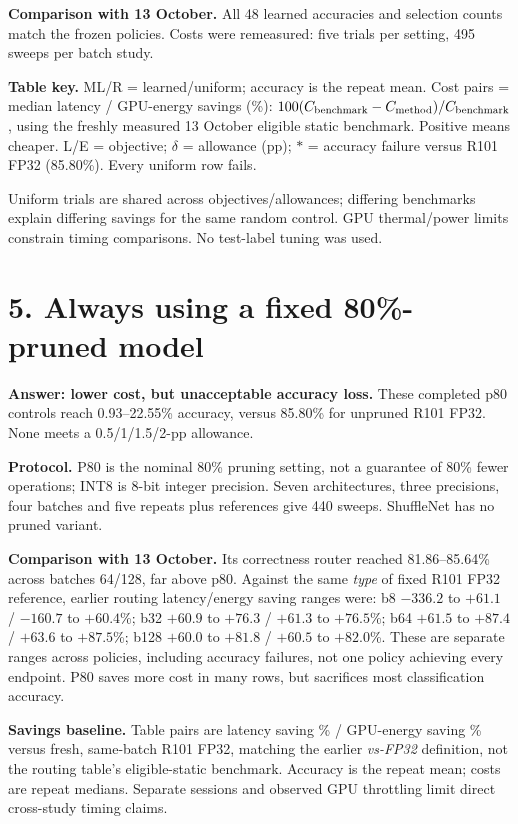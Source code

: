 \documentclass[10pt,a4paper]{article}
\renewcommand{\arraystretch}{1.13}
\begin{document}
\textbf{Comparison with 13 October.} All 48 learned accuracies and selection counts match the frozen policies. Costs were remeasured: five trials per setting, 495 sweeps per batch study.

\textbf{Table key.} ML/R = learned/uniform; accuracy is the repeat mean. Cost pairs = median latency / GPU-energy savings (\%): $100(C_{\rm benchmark}-C_{\rm method})/C_{\rm benchmark}$, using the freshly measured 13 October eligible static benchmark. Positive means cheaper. L/E = objective; $\delta$ = allowance (pp); $*$ = accuracy failure versus R101 FP32 (85.80\%). Every uniform row fails.

\begin{center}\footnotesize\setlength{\tabcolsep}{2.0pt}\renewcommand{\arraystretch}{1.25}\end{center}

Uniform trials are shared across objectives/allowances; differing benchmarks explain differing savings for the same random control. GPU thermal/power limits constrain timing comparisons. No test-label tuning was used.

\section*{5. Always using a fixed 80\%-pruned model}
\textbf{Answer: lower cost, but unacceptable accuracy loss.} These completed p80 controls reach 0.93--22.55\% accuracy, versus 85.80\% for unpruned R101 FP32. None meets a 0.5/1/1.5/2-pp allowance.

\textbf{Protocol.} P80 is the nominal 80\% pruning setting, not a guarantee of 80\% fewer operations; INT8 is 8-bit integer precision. Seven architectures, three precisions, four batches and five repeats plus references give 440 sweeps. ShuffleNet has no pruned variant.

\textbf{Comparison with 13 October.} Its correctness router reached 81.86--85.64\% across batches 64/128, far above p80. Against the same \emph{type} of fixed R101 FP32 reference, earlier routing latency/energy saving ranges were: b8 $-336.2$ to $+61.1$ / $-160.7$ to $+60.4$\%; b32 $+60.9$ to $+76.3$ / $+61.3$ to $+76.5$\%; b64 $+61.5$ to $+87.4$ / $+63.6$ to $+87.5$\%; b128 $+60.0$ to $+81.8$ / $+60.5$ to $+82.0$\%. These are separate ranges across policies, including accuracy failures, not one policy achieving every endpoint. P80 saves more cost in many rows, but sacrifices most classification accuracy.

\textbf{Savings baseline.} Table pairs are latency saving \% / GPU-energy saving \% versus fresh, same-batch R101 FP32, matching the earlier \emph{vs-FP32} definition, not the routing table's eligible-static benchmark. Accuracy is the repeat mean; costs are repeat medians. Separate sessions and observed GPU throttling limit direct cross-study timing claims.
\begin{center}\footnotesize\setlength{\tabcolsep}{4pt}\renewcommand{\arraystretch}{1.32}\end{center}


\end{document}
